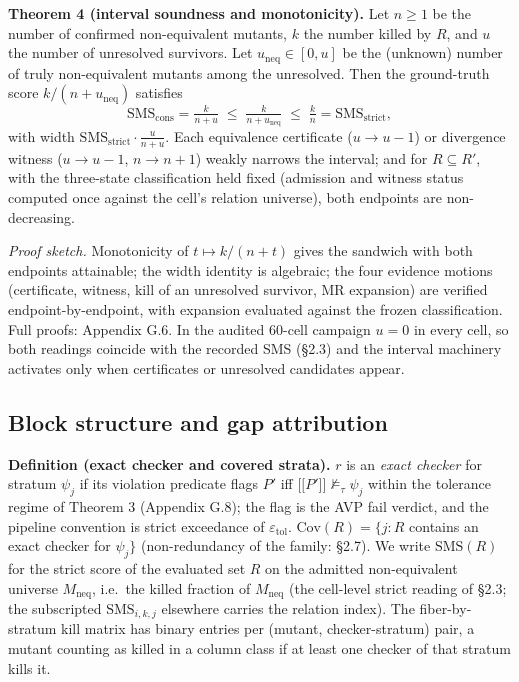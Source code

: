 \documentclass[manuscript,screen,review]{acmart}
\begin{document}
\textbf{Theorem 4 (interval soundness and monotonicity).} Let $n\ge1$ be the
number of confirmed non-equivalent mutants, $k$ the number killed by
$R$, and $u$ the number of unresolved survivors. Let
$u_{\mathrm{neq}}\in[0,u]$ be the (unknown) number of truly
non-equivalent mutants among the unresolved. Then the ground-truth score
$k/(n+u_{\mathrm{neq}})$ satisfies
\[ \mathrm{SMS}_{\mathrm{cons}}=\tfrac{k}{n+u}\;\le\;\tfrac{k}{n+u_{\mathrm{neq}}}\;\le\;\tfrac{k}{n}=\mathrm{SMS}_{\mathrm{strict}}, \]
with width $\mathrm{SMS}_{\mathrm{strict}}\cdot\tfrac{u}{n+u}$. Each
equivalence certificate ($u\!\to\!u\!-\!1$) or divergence witness
($u\!\to\!u\!-\!1$, $n\!\to\!n\!+\!1$) weakly narrows the interval; and
for $R\subseteq R'$, with the three-state classification held fixed
(admission and witness status computed once against the cell's relation
universe), both endpoints are non-decreasing.

\emph{Proof sketch.} Monotonicity of $t\mapsto k/(n+t)$ gives the
sandwich with both endpoints attainable; the width identity is
algebraic; the four evidence motions (certificate, witness, kill of an
unresolved survivor, MR expansion) are verified endpoint-by-endpoint,
with expansion evaluated against the frozen classification. Full proofs:
Appendix G.6. In the audited 60-cell campaign $u=0$ in every cell, so
both readings coincide with the recorded SMS (§2.3) and the interval
machinery activates only when certificates or unresolved candidates
appear.

\subsection{Block structure and gap attribution}\label{theory-gap}

\textbf{Definition (exact checker and covered strata).} $r$ is an
\emph{exact checker} for stratum $\psi_j$ if its violation predicate
flags $P'$ iff
$\mathopen{\lbrack\!\lbrack} P' \mathclose{\rbrack\!\rbrack}\not\models_{\tau}\psi_j$
within the tolerance regime of Theorem 3 (Appendix G.8); the flag is the
AVP fail verdict, and the pipeline convention is strict exceedance of
$\varepsilon_{\mathrm{tol}}$. $\mathrm{Cov}(R)=\{j: R$ contains an exact
checker for $\psi_j\}$ (non-redundancy of the family: §2.7). We write
$\mathrm{SMS}(R)$ for the strict score of the evaluated set $R$ on the
admitted non-equivalent universe $M_{\mathrm{neq}}$, i.e.\ the killed
fraction of $M_{\mathrm{neq}}$ (the cell-level strict reading of §2.3;
the subscripted $\mathrm{SMS}_{i,k,j}$ elsewhere carries the relation
index). The fiber-by-stratum kill matrix has binary entries per
(mutant, checker-stratum) pair, a mutant counting as killed in a column
class if at least one checker of that stratum kills it.
\end{document}

